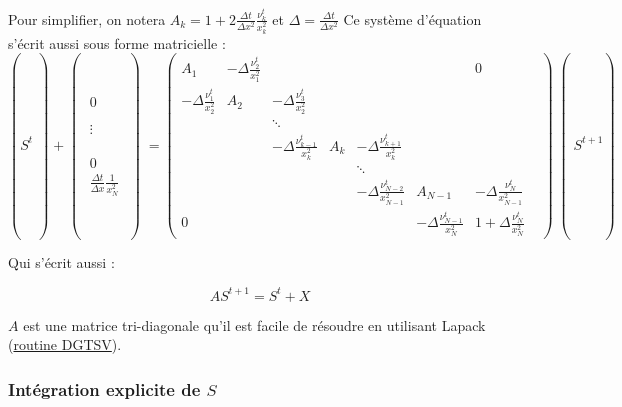 Pour simplifier, on notera $A_k = 1 + 2 \frac{\Delta t}{\Delta x^2}\frac{\nu_k^t}{x_k^2}$ et $\Delta = \frac{\Delta t}{\Delta x^2}$
Ce système d'équation s'écrit aussi sous forme matricielle :
\begin{equation}
  \left(S^t\middle) + 
  \middle(\begin{matrix}
    0 \\
    \\
    \\
    \vdots \\
    \\
    \\
    \\
    0 \\
    \frac{\Delta t}{\Delta x}\frac{1}{x_N^2}
  \end{matrix}\middle)
  =
  \begin{pmatrix}
A_1                            & -\Delta\frac{\nu_{2}^t}{x_1^2} &  & & & & 0\\
-\Delta \frac{\nu_{1}^t}{x_2^2} & A_2                           & -\Delta\frac{\nu_{3}^t}{x_2^2} & & & &\\
    &        & \ddots                          &  & & & &\\
    &        & -\Delta \frac{\nu_{k-1}^t}{x_k^2} & A_k    & -\Delta \frac{\nu_{k+1}^t}{x_k^2} & &\\
    &        &                                 & & \ddots                          & & \\
    & & & & -\Delta \frac{\nu_{N-2}^t}{x_{N-1}^2} & A_{N-1} & -\Delta \frac{\nu_{N}^t}{x_{N-1}^2}\\
    0 & & & & & -\Delta \frac{\nu_{N-1}^t}{x_N^2} & 1 + \Delta \frac{\nu_N^t}{x_N^2}
  \end{pmatrix} \middle(S^{t+1}\right)
\end{equation}

Qui s'écrit aussi :

\begin{equation}
  AS^{t+1} = S^t + X 
\end{equation}

$A$ est une matrice tri-diagonale qu'il est facile de résoudre en utilisant Lapack (\href{http://www.netlib.org/lapack/explore-html/d4/d62/group__double_g_tsolve.html#ga2bf93f2ddefa5e671866eb2191dc19d4}{routine DGTSV}).

\subsubsection{Intégration explicite de $S$}
\label{ssec:integration_S_exp}

